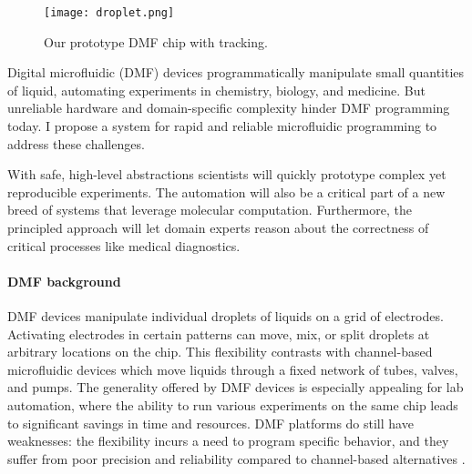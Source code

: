 \documentclass[12pt]{article}
\begin{document}
\begin{wrapfigure}{r}{0.19\linewidth}
  \footnotesize
  \centering
  \texttt{[image: droplet.png]}
  \caption*{Our prototype DMF chip with tracking.}
  \vspace{-1em}
\end{wrapfigure}


Digital microfluidic (DMF) devices programmatically manipulate small quantities of liquid,
automating experiments in chemistry, biology, and medicine.
But unreliable hardware and domain-specific complexity hinder DMF programming today.
I propose a system for rapid and reliable microfluidic programming to address these challenges.

With safe, high-level abstractions scientists will quickly prototype complex yet reproducible experiments.
The automation will also be a critical part of a new breed of systems that leverage molecular computation.
Furthermore, the principled approach will let domain experts reason about the correctness of critical processes like medical diagnostics.


\paragraph{DMF background}
DMF devices manipulate individual droplets of liquids on a grid of electrodes.
Activating electrodes in certain patterns can move, mix, or split droplets at arbitrary locations on the chip.
This flexibility contrasts with channel-based microfluidic devices which move liquids through a fixed network of tubes, valves, and pumps.
The generality offered by DMF devices is especially appealing for lab automation, where the ability to run various experiments on the same chip leads to significant savings in time and resources.
DMF platforms do still have weaknesses: the flexibility incurs a need to program specific behavior, and they suffer from poor precision and reliability compared to channel-based alternatives \cite{dmf-review}.
\end{document}
